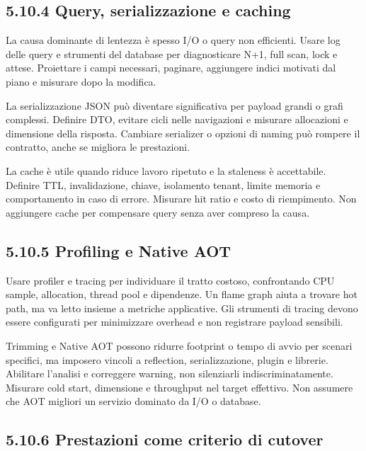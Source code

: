 \documentclass[
  italian,
  10pt,
]{book}
\begin{document}
\subsection{5.10.4 Query, serializzazione e
caching}\label{query-serializzazione-e-caching}

La causa dominante di lentezza è spesso I/O o query non efficienti.
Usare log delle query e strumenti del database per diagnosticare N+1,
full scan, lock e attese. Proiettare i campi necessari, paginare,
aggiungere indici motivati dal piano e misurare dopo la modifica.

La serializzazione JSON può diventare significativa per payload grandi o
grafi complessi. Definire DTO, evitare cicli nelle navigazioni e
misurare allocazioni e dimensione della risposta. Cambiare serializer o
opzioni di naming può rompere il contratto, anche se migliora le
prestazioni.

La cache è utile quando riduce lavoro ripetuto e la staleness è
accettabile. Definire TTL, invalidazione, chiave, isolamento tenant,
limite memoria e comportamento in caso di errore. Misurare hit ratio e
costo di riempimento. Non aggiungere cache per compensare query senza
aver compreso la causa.

\subsection{5.10.5 Profiling e Native AOT}\label{profiling-e-native-aot}

Usare profiler e tracing per individuare il tratto costoso, confrontando
CPU sample, allocation, thread pool e dipendenze. Un flame graph aiuta a
trovare hot path, ma va letto insieme a metriche applicative. Gli
strumenti di tracing devono essere configurati per minimizzare overhead
e non registrare payload sensibili.

Trimming e Native AOT possono ridurre footprint o tempo di avvio per
scenari specifici, ma imposero vincoli a reflection, serializzazione,
plugin e librerie. Abilitare l'analisi e correggere warning, non
silenziarli indiscriminatamente. Misurare cold start, dimensione e
throughput nel target effettivo. Non assumere che AOT migliori un
servizio dominato da I/O o database.

\subsection{5.10.6 Prestazioni come criterio di
cutover}\label{prestazioni-come-criterio-di-cutover}
\end{document}
